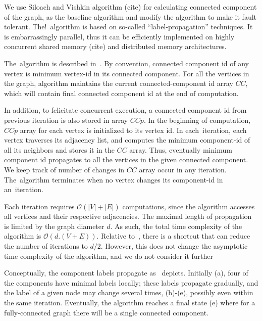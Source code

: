 


We use Siloach and Vishkin algorithm (cite) for calculating connected component of
 the graph, as the baseline algorithm and modify the algorithm to make it fault tolerant.
 The!~\sv algorithm is based on so-called ``label-propagation'' techniques. 
 It is embarrassingly parallel, thus it can be efficiently implemented on highly concurrent
 shared memory (cite) and distributed memory architectures. 


 The~\sv algorithm is described in~.
By convention, connected component id of any vertex is minimum vertex-id in its connected component.
  For all the vertices in the graph, 
 \sv algorithm maintains the current connected-component id array $CC$, which will contain 
 final connected component id at the end of computation. 

 In addition, to felicitate 
 concurrent execution, a connected component id from previous iteration is also stored in array $CCp$.
 In the beginning of computation, $CCp$ array for each vertex is initialized to its vertex id. 
In each~\sv iteration, each vertex traverses its adjacency list, and 
 computes the  minimum component-id of all its neighbors and stores it in the $CC$ array. 
 Thus, eventually minimum component id propagates to all the vertices in the given connected component.
 We keep track of number of changes in $CC$ array occur in any iteration. The~\sv algorithm terminates 
 when no vertex changes its component-id in an~\sv iteration. 

 Each iteration requires $\mathcal{O}(|V|+|E|)$ computations, since
the algorithm accesses all vertices and their respective adjacencies.
The maximal length of propagation is limited by
the graph diameter $d$. As such, the total time complexity
of the algorithm is $\mathcal{O}(d.(V+E))$. Relative to~,
there is a shortcut that can reduce the number of iterations
to $d/2$. However, this does not change the asymptotic
time complexity of the algorithm, and we do not consider it
further

Conceptually, the component labels propagate as~
depicts. Initially (a), four of the components have minimal
labels locally; these labels propagate gradually, and the label
of a given node may change several times, (b)-(e), possibly
even within the same iteration. Eventually, the algorithm
reaches a final state (e) where for a fully-connected graph
there will be a single connected component.




